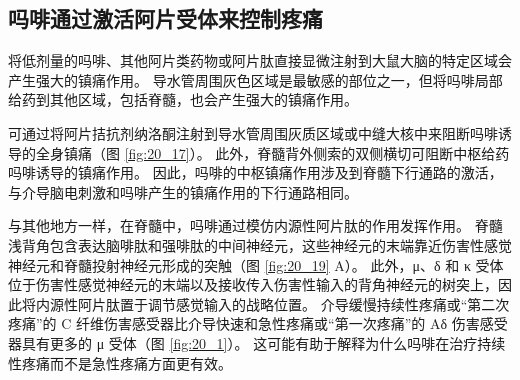 \subsection{吗啡通过激活阿片受体来控制疼痛}
将低剂量的吗啡、其他阿片类药物或阿片肽直接显微注射到大鼠大脑的特定区域会产生强大的镇痛作用。 
导水管周围灰色区域是最敏感的部位之一，但将吗啡局部给药到其他区域，包括脊髓，也会产生强大的镇痛作用。


可通过将阿片拮抗剂纳洛酮注射到导水管周围灰质区域或中缝大核中来阻断吗啡诱导的全身镇痛（图 \ref{fig:20_17}）。 
此外，脊髓背外侧索的双侧横切可阻断中枢给药吗啡诱导的镇痛作用。 
因此，吗啡的中枢镇痛作用涉及到脊髓下行通路的激活，与介导脑电刺激和吗啡产生的镇痛作用的下行通路相同。


与其他地方一样，在脊髓中，吗啡通过模仿内源性阿片肽的作用发挥作用。 
脊髓浅背角包含表达脑啡肽和强啡肽的中间神经元，这些神经元的末端靠近伤害性感觉神经元和脊髓投射神经元形成的突触（图 \ref{fig:20_19} A）。 
此外，μ、δ 和 κ 受体位于伤害性感觉神经元的末端以及接收传入伤害性输入的背角神经元的树突上，因此将内源性阿片肽置于调节感觉输入的战略位置。 
介导缓慢持续性疼痛或“第二次疼痛”的 C 纤维伤害感受器比介导快速和急性疼痛或“第一次疼痛”的 Aδ 伤害感受器具有更多的 μ 受体（图 \ref{fig:20_1}）。 
这可能有助于解释为什么吗啡在治疗持续性疼痛而不是急性疼痛方面更有效。

